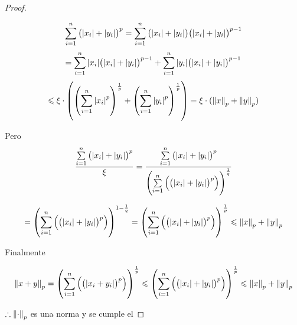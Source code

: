 \begin{proof}
\begin{enumerate}
        \begin{equation*}
            \sum\limits_{i=1}^{n} {\left( \abs{x_i}+\abs{y_i} \right)}^{p} = \sum\limits_{i=1}^{n} {\left( \abs{x_i}+\abs{y_i} \right)}{\left( \abs{{x}_{i}}+\abs{{y}_{i}} \right)}^{p-1}
        \end{equation*}
        \begin{equation*}
            =  \sum\limits_{i=1}^{n} \abs{{x}_{i}} {\left( \abs{{x}_{i}}+\abs{{y}_{i}} \right)}^{p-1} +  \sum\limits_{i=1}^{n} \abs{{y}_{i}} {\left( \abs{{x}_{i}}+\abs{{y}_{i}} \right)}^{p-1}
        \end{equation*}
        \begin{equation*}
            \leqslant \xi \cdot \left( {\left( \sum\limits_{i=1}^{n} {\abs{{x}_{i}}}^{p}\right)}^{\frac{1}{p}} + {\left( \sum\limits_{i=1}^{n} {\abs{{y}_{i}}}^{p}\right)}^{\frac{1}{p}}\right) = \xi \cdot ( {\norm{x}}_{p} + {\norm{y}}_{p})
        \end{equation*}

        Pero
        \begin{equation*}
            \frac{ \sum\limits_{i=1}^{n} {\left( \abs{x_i}+\abs{y_i} \right)}^{p}}{\xi} = \frac{\sum\limits_{i=1}^{n} {\left( \abs{x_i}+\abs{y_i} \right)}^{p}}{{\left( \sum\limits_{i=1}^{n} \left( {\left( \abs{{x}_{i}}+\abs{{y}_{i}} \right)}^{p}\right)\right)}^{\frac{1}{q}}} 
        \end{equation*}

        \begin{equation*}
            = {\left( \sum\limits_{i=1}^{n} \left( {\left( \abs{{x}_{i}}+\abs{{y}_{i}} \right)}^{p}\right)\right)}^{1-\frac{1}{q}} =  {\left( \sum\limits_{i=1}^{n} \left( {\left( \abs{{x}_{i}}+\abs{{y}_{i}} \right)}^{p}\right)\right)}^{\frac{1}{p}} \leqslant {\norm{x}}_{p} + {\norm{y}}_{p}
        \end{equation*}

        Finalmente

        \begin{equation*}
            {\norm{x + y}}_{p} = {\left( \sum\limits_{i=1}^{n} \left( {\left( \abs{{x}_{i}+{y}_{i}} \right)}^{p}\right)\right)}^{\frac{1}{p}} \leqslant {\left( \sum\limits_{i=1}^{n} \left( {\left( \abs{{x}_{i}}+\abs{{y}_{i}} \right)}^{p}\right)\right)}^{\frac{1}{p}} \leqslant {\norm{x}}_{p} + {\norm{y}}_{p}
        \end{equation*}
    \end{enumerate}

    $\therefore {\norm{\cdot}}_{p}$ es una norma y se cumple el 
\end{proof}

